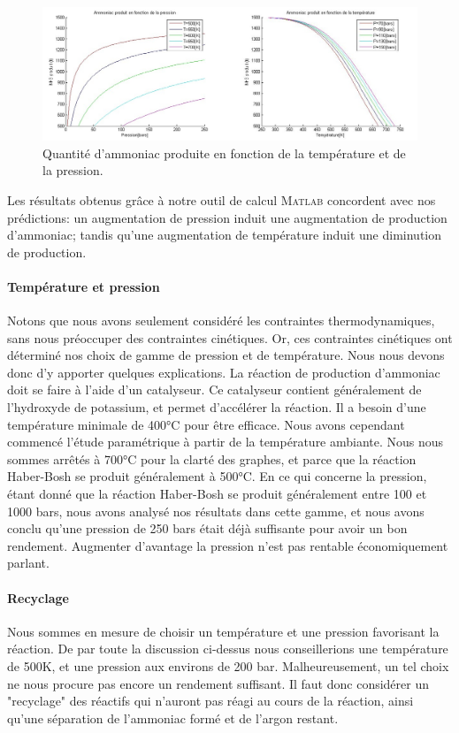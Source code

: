 \documentclass[11pt,a4paper]{report}
\begin{document}
\begin{figure}[ht!]
 \centering
 \includegraphics[scale=0.4]{fct_pression.jpg}
 \caption{Quantité d'ammoniac produite en fonction de la température et de la pression.}
 \label{fct_pression}
\end{figure}

Les résultats obtenus grâce à notre outil de calcul \textsc{Matlab} concordent avec nos prédictions: un augmentation
de pression induit une augmentation de production d'ammoniac; tandis qu'une augmentation de température induit une 
diminution de production.

\paragraph{Température et pression}
Notons que nous avons seulement considéré les contraintes thermodynamiques, sans nous préoccuper des contraintes 
cinétiques. Or, ces contraintes cinétiques ont déterminé nos choix de gamme de pression et de température. Nous nous 
devons donc d'y apporter quelques explications.
La réaction de production d'ammoniac doit se faire à l'aide d'un catalyseur. Ce catalyseur contient généralement de 
l'hydroxyde de potassium, et permet d'accélérer la réaction. Il a besoin d'une température minimale de 400°C pour être 
efficace. Nous avons cependant commencé l'étude paramétrique à partir de la température ambiante. Nous nous sommes
arrêtés à 700°C pour la clarté des graphes, et parce que la réaction Haber-Bosh se produit généralement à 500°C. 
En ce qui concerne la pression, étant donné que la réaction Haber-Bosh se produit généralement entre 100 et 1000 bars,
nous avons analysé nos résultats dans cette gamme, et nous avons conclu qu'une pression de 250 bars était déjà 
suffisante pour avoir un bon rendement. Augmenter d'avantage la pression n'est pas rentable économiquement parlant.

\paragraph{Recyclage} Nous sommes en mesure de choisir un température et une pression favorisant la réaction. De par 
toute la discussion ci-dessus nous conseillerions une température de 500K, et une pression aux environs de 200 bar. 
Malheureusement, un tel choix ne nous procure  pas encore un rendement suffisant. Il faut donc considérer un 
"recyclage" des réactifs qui n'auront pas réagi au cours de la réaction, ainsi qu'une séparation de l'ammoniac 
formé et de l'argon restant.
\end{document}
